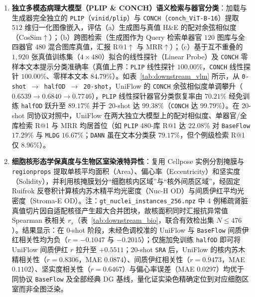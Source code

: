\documentclass[journal]{IEEEtran}
\newcommand{\methodname}{UniFlow}
\begin{document}
\begin{enumerate}
    \item \textbf{独立多模态病理大模型（PLIP \& CONCH）语义检索与器官分类}：加载与生成器完全独立的 \texttt{PLIP}（\texttt{vinid/plip}）与 \texttt{CONCH}（\texttt{conch\_ViT-B-16}）提取 $512$ 维归一化图像嵌入，评估（a）生成图与真值 H\&E 的配对余弦相似度（CosSim$\uparrow$）；（b）跨图检索（生成图作为 Query 检索单器官 $120$ 图库与全四器官 $480$ 混合图库真值，汇报 R@1$\uparrow$ 与 MRR$\uparrow$）；（c）基于互不重叠的 $1{,}920$ 张真值训练集（$4\times 480$）拟合的线性探针（Linear Probe）及 \texttt{CONCH} 零样本文本提示分类准确率（真值上界：\texttt{PLIP} 线性探针 $100.00\%$，\texttt{CONCH} 线性探针 $100.00\%$、零样本文本 $84.79\%$）。如表~\ref{tab:downstream_vlm} 所示，从 \texttt{0-shot $\to$ halfOD $\to$ 20-shot}，\methodname{} 的 \texttt{CONCH} 余弦相似度单调攀升（$0.6539 \to 0.6840 \to \mathbf{0.7746}$），\texttt{PLIP} 线性探针器官分类恢复率由 $70.21\%$ 经免训练 \texttt{halfOD} 跃升至 $89.17\%$ 并于 20-shot 达 \textbf{$99.38\%$}（\texttt{CONCH} 达 \textbf{$99.79\%$}）。在 20-shot 同协议对照中，\methodname{} 在两大独立大模型上的配对相似度、单器官/全库检索 R@1 与 MRR 均居首位（如 \texttt{PLIP} 480-库 R@1 达 \textbf{$22.08\%$} 对 \texttt{BaseFlow} $17.29\%$ 与 \texttt{MLDG} $16.67\%$；\texttt{DANN} 虽在文本分类获 $79.17\%$，但个例级检索 R@1 仅 $8.96\%$）。
    \item \textbf{细胞核形态学保真度与生物区室染液特异性}：复用 Cellpose 实例分割掩膜与 \texttt{regionprops} 提取单核平均面积（Area）、偏心率（Eccentricity）和坚实度（Solidity），并利用核掩膜划分“细胞核内区域”与“核外间质区域”，经固定 Ruifrok 反卷积计算核内苏木精平均光密度（Nuc-H OD）与间质伊红平均光密度（Stroma-E OD）。注：\texttt{gt\_nuclei\_instances\_256.npz} 中 4 例稀疏肾脏真值切片因自适配核径产生超大合并团块，故核面积同时汇报抗异常值 Spearman 秩相关 $r_s$（表~\ref{tab:downstream_bio}，联合有效检出集 $N \le 476$）。结果显示：在 0-shot 阶段，未经色调校准的 \methodname{} 与 \texttt{BaseFlow} 间质伊红相关性均为负（$r=-0.1047$ 与 $-0.2015$）；仅施加免训练 \texttt{halfOD} 即可将 \methodname{} 间质伊红 $r$ 拉升至 $+0.5511$；20-shot \texttt{SRA} 后，\methodname{} 的核内苏木精相关性（$r=\mathbf{0.8306}$，MAE $\mathbf{0.0874}$）、间质伊红相关性（$r=\mathbf{0.9473}$，MAE $\mathbf{0.1102}$）、坚实度相关性（$r=\mathbf{0.6467}$）与偏心率误差（MAE $\mathbf{0.0297}$）均优于同协议 \texttt{BaseFlow} 及全部经典 DG 基线，量化证实染色精确定位到对应细胞区室而非全图泛染。
\end{enumerate}
\end{document}
